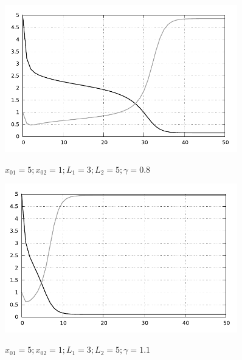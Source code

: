 \begin{figure}[h!]
    \center
    \includegraphics[width=0.9\textwidth]{images/graph_0005}
    \parbox{.8\textwidth}{ \centering
    \( x_{01} = 5; x_{02} = 1; L_1 = 3; L_2 = 5; \gamma = 0.8 \)}
    \includegraphics[width=0.9\textwidth]{images/graph_0006}
    \parbox{.8\textwidth}{ \centering
    \( x_{01} = 5; x_{02} = 1;  L_1 = 3; L_2 = 5; \gamma = 1.1 \)}
\end{figure}
